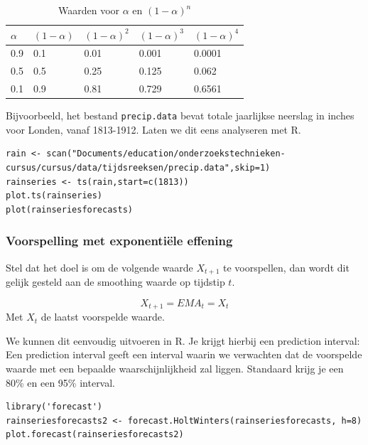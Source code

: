 \begin{table}
\centering
    \begin{tabular}{l|llll}
    $\alpha$ & $(1-\alpha)$ & $(1-\alpha)^{2}$ & $(1-\alpha)^{3}$ & $(1-\alpha)^{4}$ \\ \hline
    0.9   & 0.1       & 0.01             & 0.001                      & 0.0001           \\
    0.5   & 0.5       & 0.25             & 0.125                      & 0.062            \\
    0.1   & 0.9       & 0.81             & 0.729                      & 0.6561           \\
    \end{tabular}
		\caption{Waarden voor $\alpha$ en $(1-\alpha)^{n}$}
		\label{tab:alpha}
\end{table}


Bijvoorbeeld, het bestand \texttt{precip.data} bevat totale jaarlijkse neerslag in inches voor Londen, vanaf 1813-1912. Laten we dit eens analyseren met R.
\begin{lstlisting}
rain <- scan("Documents/education/onderzoekstechnieken-cursus/cursus/data/tijdsreeksen/precip.data",skip=1)
rainseries <- ts(rain,start=c(1813))
plot.ts(rainseries)
plot(rainseriesforecasts)
\end{lstlisting} 


\subsubsection{Voorspelling met exponenti\"ele effening}
Stel dat het doel is om de volgende waarde $X_{t+1}$ te voorspellen, dan wordt dit gelijk gesteld aan de smoothing waarde op tijdstip $t$.

\begin{equation}
	X_{t+1} = EMA_t = X_t
	\label{eq:EMA}
\end{equation}
Met $X_t$ de laatst voorspelde waarde. 

 We kunnen dit eenvoudig uitvoeren in R. Je krijgt hierbij een prediction interval: 
 Een prediction interval geeft een interval waarin we verwachten dat de voorspelde waarde met een bepaalde waarschijnlijkheid zal liggen. Standaard krijg je een 80\% en een 95\% interval. 
\begin{lstlisting} 
library('forecast')
rainseriesforecasts2 <- forecast.HoltWinters(rainseriesforecasts, h=8)
plot.forecast(rainseriesforecasts2)
\end{lstlisting} 

